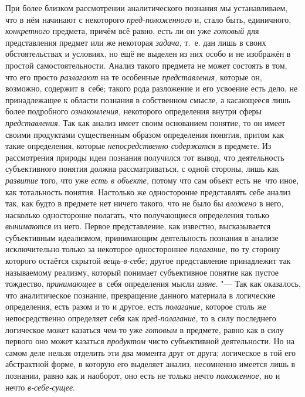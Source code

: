 При более близком рассмотрении аналитического познания мы
устанавливаем, что в нём начинают с некоторого
{\em пред-положенного}
и, стало быть, единичного,
{\em конкретного}
предмета, причём всё равно, есть ли он уже
{\em готовый} для
представления предмет или же некоторая
{\em задача,} т.~е. дан
лишь в своих обстоятельствах и условиях, но ещё не выделен из них особо и
не изображён в простой самостоятельности. Анализ такого предмета не может
состоять в том, что его просто
{\em разлагают} на те
особенные {\em представления,}
которые он, возможно, содержит в~себе; такого рода разложение
и его усвоение есть дело, не принадлежащее к области познания в собственном
смысле, а касающееся лишь более подробного
{\em ознакомления,}
некоторого определения внутри сферы
{\em представления}. Так
как анализ имеет своим основанием понятие, то он имеет своими продуктами
существенным образом определения понятия, притом как такие определения,
которые {\em непосредственно
содержатся} в предмете. Из рассмотрения природы идеи
познания получился тот вывод, что деятельность субъективного понятия должна
рассматриваться, с одной стороны, лишь как
{\em развитие} того, что
уже {\em есть в объекте,}
потому что сам объект есть не~что иное, как тотальность
понятия. Настолько же односторонне представлять себе анализ так, как будто
в предмете нет ничего такого, что не было бы
{\em вложено} в него,
насколько односторонне полагать, что получающиеся определения
только {\em вынимаются}
из него. Первое представление, как известно, высказывается
субъективным идеализмом, принимающим деятельность познания в анализе
исключительно только за некоторое одностороннее
{\em полагание,} по ту
сторону которого остаётся скрытой
{\em вещь-в-себе;} другое
представление принадлежит так называемому реализму, который понимает
субъективное понятие как пустое тождество,
{\em принимающее} в~себя
определения мысли {\em извне}. "---
Так как оказалось, что аналитическое познание, превращение
данного материала в логические определения, есть разом и то и другое, есть
{\em полагание,} которое
столь же непосредственно определяет себя как
{\em пред-полагание,} то
в силу последнего логическое может казаться чем-то уже
{\em готовым} в предмете,
равно как в силу первого оно может казаться
{\em продуктом} чисто
субъективной деятельности. Но на самом деле нельзя отделить эти два момента
друг от друга; логическое в той его абстрактной форме, в которую его
выделяет анализ, несомненно имеется лишь в познании, равно как и наоборот,
оно есть не только нечто
{\em положенное,} но и
нечто {\em в-себе-сущее}.

